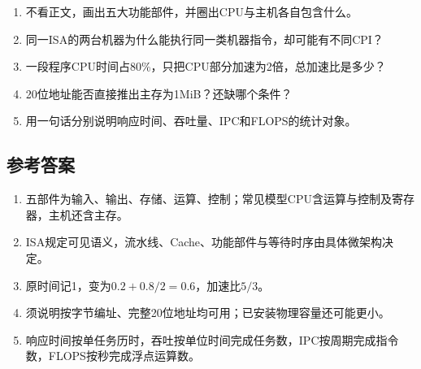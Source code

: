 \begin{recallcard}[主动回忆·自拟]

\begin{enumerate}
\def\labelenumi{\arabic{enumi}.}
\tightlist
\item
  不看正文，画出五大功能部件，并圈出CPU与主机各自包含什么。
\item
  同一ISA的两台机器为什么能执行同一类机器指令，却可能有不同CPI？
\item
  一段程序CPU时间占80\%，只把CPU部分加速为2倍，总加速比是多少？
\item
  20位地址能否直接推出主存为1MiB？还缺哪个条件？
\item
  用一句话分别说明响应时间、吞吐量、IPC和FLOPS的统计对象。
\end{enumerate}

\end{recallcard}

\subsection{参考答案}\label{CO01-answers}

\begin{enumerate}
\def\labelenumi{\arabic{enumi}.}
\tightlist
\item
  五部件为输入、输出、存储、运算、控制；常见模型CPU含运算与控制及寄存器，主机还含主存。
\item
  ISA规定可见语义，流水线、Cache、功能部件与等待时序由具体微架构决定。
\item
  原时间记1，变为\(0.2+0.8/2=0.6\)，加速比\(5/3\)。
\item
  须说明按字节编址、完整20位地址均可用；已安装物理容量还可能更小。
\item
  响应时间按单任务历时，吞吐按单位时间完成任务数，IPC按周期完成指令数，FLOPS按秒完成浮点运算数。
\end{enumerate}
